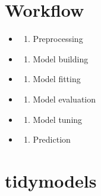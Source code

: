 \documentclass[
]{book}
\providecommand{\tightlist}{%
  \setlength{\itemsep}{0pt}\setlength{\parskip}{0pt}}
\begin{document}
\section{Workflow}\label{workflow-3}

\begin{itemize}
\tightlist
\item
  \begin{enumerate}
  \def\labelenumi{\arabic{enumi}.}
  \tightlist
  \item
    Preprocessing
  \end{enumerate}
\item
  \begin{enumerate}
  \def\labelenumi{\arabic{enumi}.}
  \setcounter{enumi}{1}
  \tightlist
  \item
    Model building
  \end{enumerate}
\item
  \begin{enumerate}
  \def\labelenumi{\arabic{enumi}.}
  \setcounter{enumi}{2}
  \tightlist
  \item
    Model fitting
  \end{enumerate}
\item
  \begin{enumerate}
  \def\labelenumi{\arabic{enumi}.}
  \setcounter{enumi}{3}
  \tightlist
  \item
    Model evaluation
  \end{enumerate}
\item
  \begin{enumerate}
  \def\labelenumi{\arabic{enumi}.}
  \setcounter{enumi}{4}
  \tightlist
  \item
    Model tuning
  \end{enumerate}
\item
  \begin{enumerate}
  \def\labelenumi{\arabic{enumi}.}
  \setcounter{enumi}{5}
  \tightlist
  \item
    Prediction
  \end{enumerate}
\end{itemize}

\section{tidymodels}\label{tidymodels}
\end{document}
